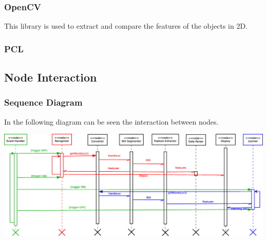 \documentclass{article}
\begin{document}
\subsubsection{ OpenCV}
This library is used to extract and compare the features of the objects in 2D. 
\subsubsection{PCL}

\subsection{Node Interaction}

\subsubsection{Sequence Diagram}
In the following diagram can be seen the interaction between nodes. 
\begin{center}
\includegraphics[scale=0.3]{../diagrams/images/sequence.eps}
\end{center}
\end{document}
